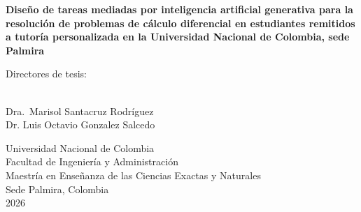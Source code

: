 \documentclass[11pt,spanish,fleqn,openany,twoside,letterpaper]{book}
\newcommand{\studentname}{}
\newcommand{\thesisname}{}
\newcommand{\director}{}
\newcommand{\codirector}{} %
\newcommand{\issuedate}{}
\newcommand{\sede}{}
\newcommand{\faculty}{}
\newcommand{\university}{Universidad Nacional de Colombia}
\renewcommand{\thesisname}{Diseño de tareas mediadas por inteligencia artificial generativa para la resolución de problemas de cálculo diferencial en estudiantes remitidos a tutoría personalizada en la Universidad Nacional de Colombia, sede Palmira}
\renewcommand{\issuedate}{2026}
\renewcommand{\codirector}{Dra.~Marisol Santacruz Rodríguez \\
Dr. Luis Octavio Gonzalez Salcedo}
\renewcommand{\sede}{Sede Palmira}
\renewcommand{\faculty}{Facultad de Ingeniería y Administración}
\begin{document}
\renewcommand{\listfigurename}{Lista de figuras}
\renewcommand{\listtablename}{Lista de tablas}
\renewcommand{\contentsname}{Contenido}
\renewcommand{\chaptername}{Capítulo}
\renewcommand{\tablename}{\scriptsize \centering \textbf{Tabla}}
\renewcommand{\figurename}{\scriptsize \centering \textbf{Figura}}
\renewcommand{\appendixname}{Anexo}

\renewcommand{\bibname}{Referencias Bibliográficas}

{\newpage
\thispagestyle{empty}
\begin{center}

\vspace*{1cm}

\begin{figure}[h]
\centering
{}%
\end{figure}

\vspace{1.5cm}

\textbf{\LARGE \thesisname}

\vspace{0.5cm}

\textbf{\Large \studentname}

\vspace{0.5cm}

Directores de tesis:

\vspace{0.5cm}

{\director}\\[0.3cm]
{\codirector}

\vspace{\fill}

{\Large \university}\\[0.3cm]
{\large \faculty}\\[0.2cm]
{\normalsize Maestría en Enseñanza de las Ciencias Exactas y Naturales}\\[0.3cm]
{\normalsize \sede, Colombia}\\[0.2cm]
{\normalsize \issuedate}

\end{center}

}
\end{document}
